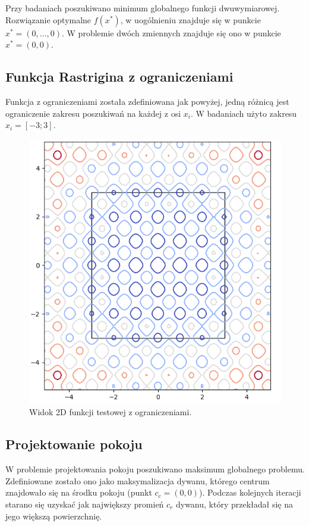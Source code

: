 Przy badaniach poszukiwano minimum globalnego funkcji dwuwymiarowej. Rozwiązanie optymalne $f(x^{*})$, w uogólnieniu znajduje się w punkcie $x^{*} = (0, ..., 0)$. W problemie dwóch zmiennych znajduje się ono w punkcie $x^{*} = (0, 0)$.

\subsection{Funkcja Rastrigina z ograniczeniami}

Funkcja z ograniczeniami została zdefiniowana jak powyżej, jedną różnicą jest ograniczenie zakresu poszukiwań na każdej z osi $x_{i}$. W badaniach użyto zakresu $x_{i} = [-3; 3]$.

\begin{figure}[H]
	\centering
	\includegraphics[width=0.4\linewidth]{imgs/rastrigin_2d_limited_plot}
	\caption{Widok 2D funkcji testowej z ograniczeniami.}
	\label{fig:rastrigin_2d_limited_plot}
\end{figure}

\pagebreak

\subsection{Projektowanie pokoju}

W problemie projektowania pokoju poszukiwano maksimum globalnego problemu. Zdefiniowane zostało ono jako maksymalizacja dywanu, którego centrum znajdowało się na środku pokoju (punkt $c_{c} = (0, 0)$). Podczas kolejnych iteracji starano się uzyskać jak największy promień $c_{r}$ dywanu, który przekładał się na jego większą powierzchnię. 

